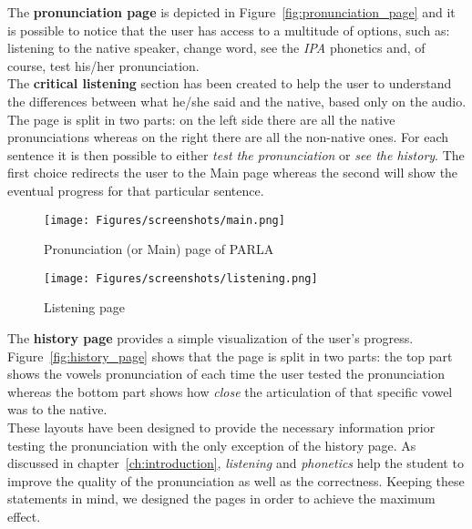 \noindent The \textbf{pronunciation page} is depicted in Figure~\ref{fig:pronunciation_page} and it is possible to notice that the user has access to a multitude of options, such as: listening to the native speaker, change word, see the \textit{IPA} phonetics and, of course, test his/her pronunciation. \\

\noindent The \textbf{critical listening} section has been created to help the user to understand the differences between what he/she said and the native, based only on the audio. The page is split in two parts: on the left side there are all the native pronunciations whereas on the right there are all the non-native ones. For each sentence it is then possible to either \textit{test the pronunciation} or \textit{see the history}. The first choice redirects the user to the Main page whereas the second will show the eventual progress for that particular sentence. \\

\begin{figure}[!ht]
	\centering
	\begin{minipage}{.5\textwidth}
		\centering
		\texttt{[image: Figures/screenshots/main.png]}
		\caption{Pronunciation (or Main) page of PARLA}
		\label{fig:pronunciation_page}
	\end{minipage}%
	\begin{minipage}{.5\textwidth}
		\centering
		\texttt{[image: Figures/screenshots/listening.png]}
		\caption{Listening page}
		\label{fig:listening_page}
	\end{minipage}
\end{figure}

\noindent The \textbf{history page} provides a simple visualization of the user's progress. Figure~\ref{fig:history_page} shows that the page is split in two parts: the top part shows the vowels pronunciation of each time the user tested the pronunciation whereas the bottom part shows how \textit{close} the articulation of that specific vowel was to the native. \\

\noindent These layouts have been designed to provide the necessary information prior testing the pronunciation with the only exception of the history page. As discussed in chapter~\ref{ch:introduction}, \textit{listening} and \textit{phonetics} help the student to improve the quality of the pronunciation as well as the correctness. Keeping these statements in mind, we designed the pages in order to achieve the maximum effect. \\

